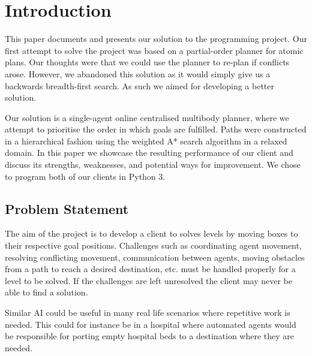 \section{Introduction}
\label{sec:introduction}


This paper documents and presents our solution to the programming project.
Our first attempt to solve the project was based on a partial-order planner for atomic plans.
Our thoughts were that we could use the planner to re-plan if conflicts arose.
However, we abandoned this solution as it would simply give us a backwards breadth-first search.
As such we aimed for developing a better solution.

Our solution is a single-agent online centralised multibody planner, where we attempt to prioritise the order in which goals are fulfilled.
Paths were constructed in a hierarchical fashion using the weighted A* search algorithm in a relaxed domain.
In this paper we showcase the resulting performance of our client and discuss its strengths, weaknesses, and potential ways for improvement.
We chose to program both of our clients in Python 3.

\subsection{Problem Statement}

The aim of the project is to develop a client to solves levels by moving boxes to their respective goal positions.
Challenges such as coordinating agent movement, resolving conflicting movement, communication between agents, moving obstacles from a path to reach a desired destination, etc. must be handled properly for a level to be solved.
If the challenges are left unresolved the client may never be able to find a solution.

Similar AI could be useful in many real life scenarios where repetitive work is needed.
This could for instance be in a hospital where automated agents would be responsible for porting empty hospital beds to a destination where they are needed.




